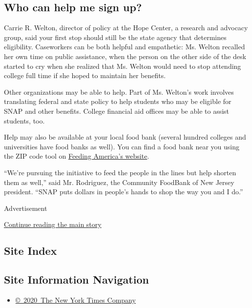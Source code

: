 \hypertarget{who-can-help-me-sign-up}{%
\subsection{Who can help me sign up?}\label{who-can-help-me-sign-up}}

Carrie R. Welton, director of policy at the Hope Center, a research and
advocacy group, said your first stop should still be the state agency
that determines eligibility. Caseworkers can be both helpful and
empathetic: Ms. Welton recalled her own time on public assistance, when
the person on the other side of the desk started to cry when she
realized that Ms. Welton would need to stop attending college full time
if she hoped to maintain her benefits.

Other organizations may be able to help. Part of Ms. Welton's work
involves translating federal and state policy to help students who may
be eligible for SNAP and other benefits. College financial aid offices
may be able to assist students, too.

Help may also be available at your local food bank (several hundred
colleges and universities have food banks as well). You can find a food
bank near you using the ZIP code tool on
\href{https://www.feedingamerica.org/find-your-local-foodbank}{Feeding
America's website}.

``We're pursuing the initiative to feed the people in the lines but help
shorten them as well,'' said Mr. Rodriguez, the Community FoodBank of
New Jersey president. ``SNAP puts dollars in people's hands to shop the
way you and I do.''

Advertisement

\protect\hyperlink{after-bottom}{Continue reading the main story}

\hypertarget{site-index}{%
\subsection{Site Index}\label{site-index}}

\hypertarget{site-information-navigation}{%
\subsection{Site Information
Navigation}\label{site-information-navigation}}

\begin{itemize}
\tightlist
\item
  \href{https://help.nytimes3xbfgragh.onion/hc/en-us/articles/115014792127-Copyright-notice}{©~2020~The
  New York Times Company}
\end{itemize}

